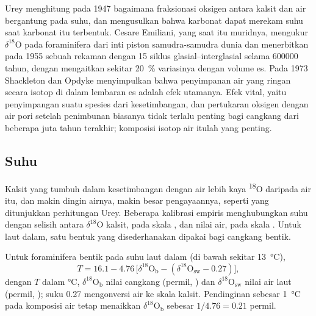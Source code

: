 \begin{history}
Urey menghitung pada 1947 bagaimana fraksionasi oksigen antara kalsit dan air bergantung pada
suhu, dan mengusulkan bahwa karbonat dapat merekam suhu saat karbonat itu terbentuk. Cesare
Emiliani, yang saat itu muridnya, mengukur $\delta^{18}$O pada foraminifera dari inti piston
samudra-samudra dunia dan menerbitkan pada 1955 sebuah rekaman dengan 15 siklus glasial--interglasial selama
\num{600000} tahun, dengan mengaitkan sekitar \qty{20}{\percent} variasinya dengan volume es.
Pada 1973 Shackleton dan Opdyke menyimpulkan bahwa penyimpanan air yang ringan secara isotop di dalam
lembaran es adalah efek utamanya. Efek vital, yaitu penyimpangan suatu spesies dari kesetimbangan,
dan pertukaran oksigen dengan air pori setelah penimbunan biasanya tidak terlalu penting bagi
cangkang dari beberapa juta tahun terakhir; komposisi isotop air itulah yang penting.
\end{history}

\subsection*{Suhu}

Kalsit yang tumbuh dalam kesetimbangan dengan air lebih kaya \textsuperscript{18}O daripada air itu,
dan makin dingin airnya, makin besar pengayaannya, seperti yang ditunjukkan perhitungan Urey. Beberapa
kalibrasi empiris menghubungkan
suhu dengan selisih antara $\delta^{18}$O kalsit, pada skala , dan
nilai air, pada skala . Untuk laut dalam, satu bentuk yang disederhanakan dipakai bagi cangkang
bentik.

\begin{proposition}\label{prop:b2:climate-proxies:benthic}
Untuk foraminifera bentik pada suhu laut dalam (di bawah sekitar \qty{13}{\celsius}),
\[
  T = 16.1 - 4.76\,\bigl[\delta^{18}\mathrm{O}_{\mathrm{b}} - (\delta^{18}\mathrm{O}_{\mathrm{sw}} -
  0.27)\bigr],
\]
dengan $T$ dalam \unit{\celsius}, $\delta^{18}\mathrm{O}_{\mathrm{b}}$ nilai cangkang (permil,
) dan $\delta^{18}\mathrm{O}_{\mathrm{sw}}$ nilai air laut (permil, ); suku
0.27 mengonversi air ke skala kalsit. Pendinginan sebesar \qty{1}{\celsius} pada komposisi air
tetap menaikkan $\delta^{18}\mathrm{O}_{\mathrm{b}}$ sebesar $1/4.76 = 0.21$ permil.
\end{proposition}
\admitted

